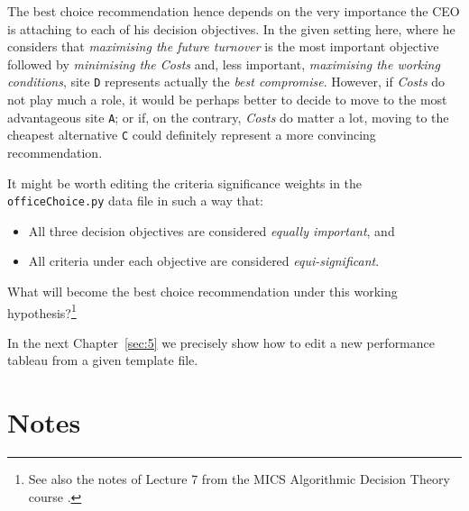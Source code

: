 The best choice recommendation hence depends on the very importance the CEO is attaching to each of his decision objectives. In the given setting here, where he considers that \emph{maximising the future turnover} is the most important objective followed by \emph{minimising the Costs} and, less important, \emph{maximising the working conditions}, site \texttt{D} represents actually the \emph{best compromise}. However, if \emph{Costs} do not play much a role, it would be perhaps better to decide to move to the most advantageous site \texttt{A}; or if, on the contrary, \emph{Costs} do matter a lot, moving to the cheapest alternative \texttt{C} could definitely represent a more convincing recommendation. 

It might be worth editing the criteria significance weights in the\\
\texttt{officeChoice.py} data file in such a way that:
\begin{itemize}[topsep=2pt]
\item All three decision objectives are considered \emph{equally important}, and
\item All criteria under each objective are considered \emph{equi-significant}.
\end{itemize}

What will become the best choice recommendation under this working hypothesis?\footnote{See also the notes of Lecture 7 from the MICS Algorithmic Decision Theory course \citep{ADT-L7}.} 

\vspace{1cm}

In the next Chapter~\ref{sec:5} we precisely show how to edit a new performance tableau from a given template file. 

{}
\section*{Notes}

